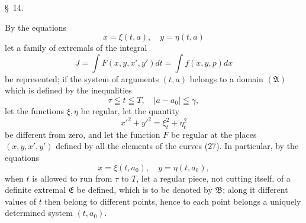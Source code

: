 \documentclass[11pt,a4paper,leqno]{article}
\begin{document}
\begin{center}{\large \S~14.}\end{center}

By the equations
\begin{equation}\tag{27}
x=\xi(t,a),\quad y=\eta(t,a)
\end{equation}
let a family of extremals of the integral
\[
J=\int F(x,y,x',y')dt=\int f(x,y,p)dx
\]
be represented; if the system of arguments $(t,a)$ belongs to a domain $(\mathfrak{A})$ which is defined by the inequalities
\[
\tau\leqq t\leqq T,\quad |a-a_0|\leqq \gamma,
\]
let the functions $\xi,\eta$ be regular, let the quantity
\[
x'^2+y'^2=\xi_t^2+\eta_t^2
\]
be different from zero, and let the function $F$ be regular at the places $(x,y,x',y')$ defined by all the elements of the curves (27). In particular, by the equations
\[
x=\xi(t,a_0),\quad y=\eta(t,a_0),
\]
when $t$ is allowed to run from $\tau$ to $T$, let a regular piece, not cutting itself, of a definite extremal $\mathfrak{E}$ be defined, which is to be denoted by $\mathfrak{B}$; along it different values of $t$ then belong to different points, hence to each point belongs a uniquely determined system $(t,a_0)$.
\end{document}
